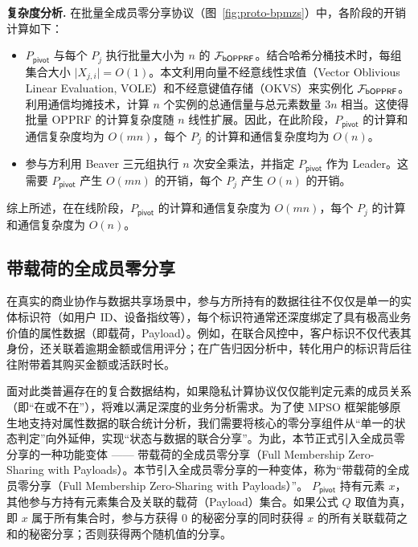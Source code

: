 \begin{trivlist}
\item \textbf{复杂度分析.} 在批量全成员零分享协议（图~\ref{fig:proto-bpmzs}）中，各阶段的开销计算如下：
\begin{itemize}
  \item $P_\mathsf{pivot}$ 与每个 $P_j$ 执行批量大小为 $n$ 的 $\mathcal{F}_\mathsf{bOPPRF}$。结合哈希分桶技术时，每组集合大小 $\lvert X_{j,i} \rvert = O(1)$。本文利用向量不经意线性求值（Vector Oblivious Linear Evaluation, VOLE）和不经意键值存储（OKVS）来实例化 $\mathcal{F}_\mathsf{bOPPRF}$。利用通信均摊技术，计算 $n$ 个实例的总通信量与总元素数量 $3n$ 相当。这使得批量 OPPRF 的计算复杂度随 $n$ 线性扩展。因此，在此阶段，$P_\mathsf{pivot}$ 的计算和通信复杂度均为 $O(mn)$，每个 $P_j$ 的计算和通信复杂度均为 $O(n)$。
  \item 参与方利用 Beaver 三元组执行 $n$ 次安全乘法，并指定 $P_\mathsf{pivot}$ 作为 Leader。这需要 $P_\mathsf{pivot}$ 产生 $O(mn)$ 的开销，每个 $P_j$ 产生 $O(n)$ 的开销。
\end{itemize}
综上所述，在在线阶段，$P_\mathsf{pivot}$ 的计算和通信复杂度为 $O(mn)$，每个 $P_j$ 的计算和通信复杂度为 $O(n)$。
\end{trivlist}

\subsection{带载荷的全成员零分享}

在真实的商业协作与数据共享场景中，参与方所持有的数据往往不仅仅是单一的实体标识符（如用户 ID、设备指纹等），每个标识符通常还深度绑定了具有极高业务价值的属性数据（即载荷，Payload）。例如，在联合风控中，客户标识不仅代表其身份，还关联着逾期金额或信用评分；在广告归因分析中，转化用户的标识背后往往附带着其购买金额或活跃时长。

面对此类普遍存在的复合数据结构，如果隐私计算协议仅仅能判定元素的成员关系（即“在或不在”），将难以满足深度的业务分析需求。为了使 MPSO 框架能够原生地支持对属性数据的联合统计分析，我们需要将核心的零分享组件从“单一的状态判定”向外延伸，实现“状态与数据的联合分享”。为此，本节正式引入全成员零分享的一种功能变体 —— 带载荷的全成员零分享（Full Membership Zero-Sharing with Payloads）。本节引入全成员零分享的一种变体，称为“带载荷的全成员零分享（Full Membership Zero-Sharing with Payloads）”。 $P_\mathsf{pivot}$ 持有元素 $x$，其他参与方持有元素集合及关联的载荷（Payload）集合。如果公式 $Q$ 取值为真，即 $x$ 属于所有集合时，参与方获得 0 的秘密分享的同时获得 $x$ 的所有关联载荷之和的秘密分享；否则获得两个随机值的分享。

